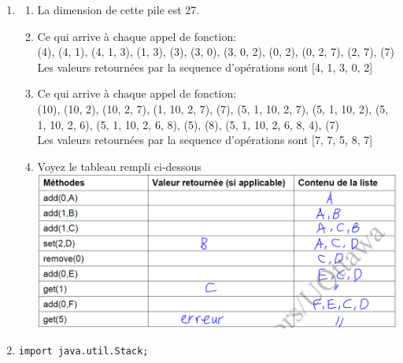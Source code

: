 \documentclass[12pt]{book}
\begin{document}
\newcommand{\reporttitle}{Laboratoire 2}
\newcommand{\reportauthorOne}{Kien Do}
\newcommand{\cidOne}{300163370}






\begin{enumerate}
\item

    \begin{enumerate}
        \item La dimension de cette pile est 27.
        \item Ce qui arrive à chaque appel de fonction: \\(4), (4, 1), (4, 1, 3), (1, 3), (3), (3, 0), (3, 0, 2), (0, 2), (0, 2, 7), (2, 7), (7)\\
        Les valeurs retournées par la sequence d'opérations sont [4, 1, 3, 0, 2]
        \item  Ce qui arrive à chaque appel de fonction: \\(10), (10, 2), (10, 2, 7), (1, 10, 2, 7), (7), (5, 1, 10, 2, 7), (5, 1, 10, 2), (5, 1, 10, 2, 6), (5, 1, 10, 2, 6, 8), (5), (8), (5, 1, 10, 2, 6, 8, 4), (7)\\
        Les valeurs retournées par la sequence d'opérations sont [7, 7, 5, 8, 7]
        \item Voyez le tableau rempli ci-dessous\\ \includegraphics[scale=0.5]{question1d.png}
    \end{enumerate}

\item 
\begin{verbatim}
import java.util.Stack;


\end{verbatim}
\end{enumerate}
\end{document}
